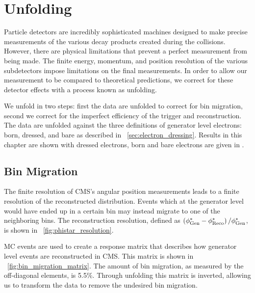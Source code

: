 \section{Unfolding}
\label{sec:unfolding}

Particle detectors are incredibly sophisticated machines designed to make
precise measurements of the various decay products created during the
collisions. However, there are physical limitations that prevent a perfect
measurement from being made. The finite energy, momentum, and position
resolution of the various subdetectors impose limitations on the final
measurements. In order to allow our measurement to be compared to theoretical
predictions, we correct for these detector effects with a process known as
unfolding.

We unfold in two steps: first the data are unfolded to correct for bin
migration, second we correct for the imperfect efficiency of the trigger and
reconstruction. The data are unfolded against the three definitions of
generator level electrons: born, dressed, and bare as described in
\SEC~\ref{sec:electron_dressing}. Results in this chapter are shown with
dressed electrons, born and bare electrons are given in \APP{}.

\subsection{Bin Migration}
\label{ssec:bin_migration}

The finite resolution of CMS's angular position measurements leads to a finite
resolution of the reconstructed \phistar distribution. Events which at the
generator level would have ended up in a certain \phistar bin may instead
migrate to one of the neighboring bins. The \phistar reconstruction resolution,
defined as $\left( \phi^{*}_{\text{Gen}} - \phi^{*}_{\text{Reco}} \right) / \phi^{*}_{\text{Gen}}$, is shown
in \FIG~\ref{fig:phistar_resolution}.

MC events are used to create a response matrix that describes how generator
level events are reconstructed in CMS. This matrix is shown in
\FIG~\ref{fig:bin_migration_matrix}. The amount of bin migration, as measured
by the off-diagonal elements, is 5.5\%. Through unfolding this matrix is
inverted, allowing us to transform the data to remove the undesired bin
migration.

